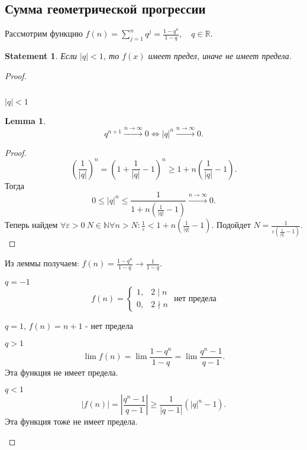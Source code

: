 \documentclass[11pt]{book}
\newcommand{\N}{\mathbb{N}}
\newcommand{\R}{\mathbb{R}}
\renewcommand{\le}{\leqslant}
\renewcommand{\ge}{\geqslant}
\theoremstyle{definition}
\theoremstyle{plain}
\theoremstyle{plain}
\newtheorem*{lm}{Lemma}
\newtheorem*{st}{Statement}
\theoremstyle{definition}
\theoremstyle{remark}
\begin{document}
\subsection{Сумма геометрической прогрессии}\label{ques_24}
Рассмотрим функцию $f(n) = \sum\limits_{j=1}^n q^j = \frac{1-q^n}{1-q}, \quad q \in \R$.
\begin{st}
    Если $|q| < 1$, то $f(x)$ имеет предел, иначе не имеет предела.
\end{st}
\begin{proof}
    \begin{enumerate}$ $
        \item $|q| < 1$ \\
	    {\begin{lm}
	    \[
		q^{n+1} \stackrel{n \to  \infty } \longrightarrow 0 \Longleftrightarrow |q|^n\stackrel{n \to  \infty } \longrightarrow 0 
	   .\] 
	    \end{lm}
	    \begin{proof}
		\[
		    \left (\frac{1}{|q|} \right)^n = \left(1 + \frac{1}{|q|} -1\right)^n \ge 1 +n \left(\frac{1}{|q|}-1\right)
		.\]
		Тогда \[
		    0 \le |q|^n \le \frac{1}{1+n \left(\frac{1}{|q|} -1 \right)} \stackrel{n \to  \infty } \longrightarrow 0
		.\]  
		Теперь найдем $\forall \varepsilon>0 ~N \in \N \forall n > N: \frac{1}{\varepsilon } < 1 + n \left(\frac{1}{|q|} -1 \right)$. Подойдет $N = \frac{1}{\varepsilon \left(\frac{1}{|q|}-1 \right)}$. \\
	    \end{proof}
	    Из леммы получаем:
	    $f(n) = \frac{1-q^n}{1-q} \longrightarrow \frac{1}{1-q}$. 
	\item $q=- 1$  \[
		f(n) = \left \{ 
		    \begin{array}{ll}
			1 ,& 2 \mid n \\
			0  ,& 2 \nmid n
		    \end{array}
		    \right . \mbox{ нет предела}
	    \]  }
    \item $q = 1$,  $f(n) = n+1$ - нет предела
    \item $q > 1$ \\
	\[
	    \lim f(n) = \lim \frac{1 - q^n}{1 - q} = \lim \frac{q^n-1}{q-1} 
	.\] 
	Эта функция не имеет предела.
    \item $q < 1$ \\
	\[
	    |f(n) | = |\frac{q^n-1}{q-1}| \ge  \frac{1}{|q-1|}(|q|^n -1)
	.\] 
	Эта функция тоже не имеет предела.
    \end{enumerate}
\end{proof}
\end{document}
